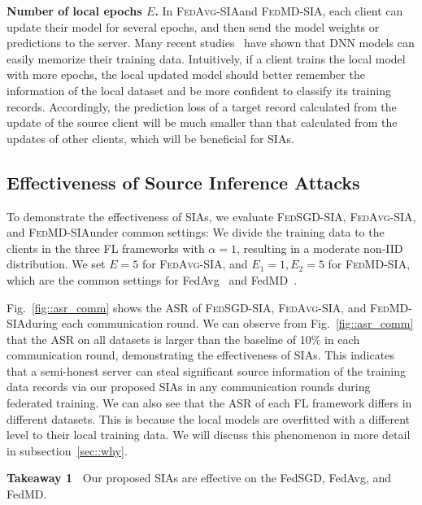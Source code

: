 \documentclass[10pt,journal,compsoc]{IEEEtran}
\newcommand*\fedavg{\textsc{FedAvg-SIA}}
\newcommand*\fedsgd{\textsc{FedSGD-SIA}}
\newcommand*\fedmd{\textsc{FedMD-SIA}}
\begin{document}
\noindent\textbf{Number of local epochs $E$. \;} In \fedavg \;and \fedmd,\; each client can update their model for several epochs, and then send the model weights or predictions to the server. Many recent studies~\cite{song2017machine,carlini2019secret,murakonda2020ml,zhang2021understanding} have shown that DNN models can easily memorize their training data. Intuitively, if a client trains the local model with more epochs, the local updated model should better remember the information of the local dataset and be more confident to classify its training records. Accordingly, the prediction loss of a target record calculated from the update of the source client will be much smaller than that calculated from the updates of other clients, which will be beneficial for SIAs. 




\subsection{Effectiveness of Source Inference Attacks}
To demonstrate the effectiveness of SIAs, we evaluate \fedsgd, \fedavg, and \fedmd \;under common settings: We divide the training data to the clients in the three FL frameworks with $\alpha=1$, resulting in a moderate non-IID distribution. We set $E=5$ for \fedavg, and $E_1=1, E_2=5$ for \fedmd, \;which are the common settings for FedAvg~\cite{mcmahan2017communication} and FedMD~\cite{li2019fedmd}. 

Fig.~\ref{fig::asr_comm} shows the ASR of \fedsgd, \fedavg, and \fedmd \;during each communication round. We can observe from Fig.~\ref{fig::asr_comm} that the ASR on all datasets is larger than the baseline of 10\% in each communication round, demonstrating the effectiveness of SIAs. {This indicates that a semi-honest server can steal significant source information of the training data records via our proposed SIAs in any communication rounds during federated training.} We can also see that the ASR of each FL framework differs in different datasets. This is because the local models are overfitted with a different level to their local training data. We will discuss this phenomenon in more detail in subsection~\ref{sec::why}.

\begin{mdframed}[backgroundcolor=white!10,rightline=true,leftline=true,topline=true,bottomline=true,roundcorner=2mm,everyline=true]
\textbf{Takeaway 1~}
Our proposed SIAs are effective on the FedSGD, FedAvg, and FedMD.
\end{mdframed}
\end{document}
